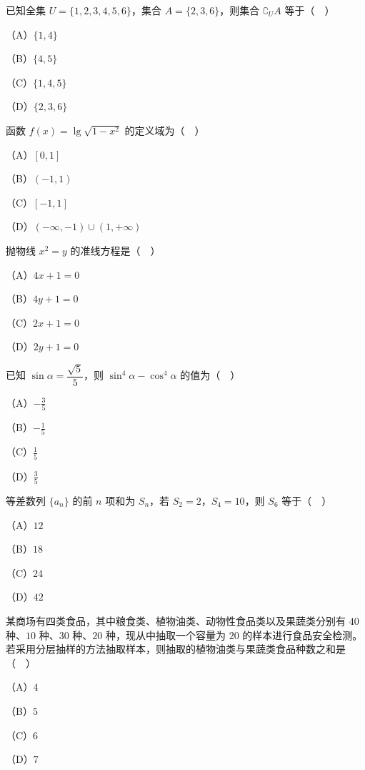 


\begin{question}
已知全集 $U=\{1,2,3,4,5,6\}$，集合 $A=\{2,3,6\}$，则集合 $\complement_UA$ 等于（　）

（A）$\{1,4\}$

（B）$\{4,5\}$

（C）$\{1,4,5\}$

（D）$\{2,3,6\}$

\end{question}
\begin{question}
函数 $f(x)=\lg\sqrt{1-x^2}$ 的定义域为（　）

（A）$[0,1]$

（B）$(-1,1)$

（C）$[-1,1]$

（D）$(-\infty,-1)\cup(1,+\infty)$

\end{question}
\begin{question}
抛物线 $x^2=y$ 的准线方程是（　）

（A）$4x+1=0$

（B）$4y+1=0$

（C）$2x+1=0$

（D）$2y+1=0$

\end{question}
\begin{question}
已知 $\sin\alpha=\dfrac{\sqrt5}{5}$，则 $\sin^4\alpha-\cos^4\alpha$ 的值为（　）

（A）$-\frac35$

（B）$-\frac15$

（C）$\frac15$

（D）$\frac35$

\end{question}
\begin{question}
等差数列 $\{a_n\}$ 的前 $n$ 项和为 $S_n$，若 $S_2=2$，$S_4=10$，则 $S_6$ 等于（　）

（A）$12$

（B）$18$

（C）$24$

（D）$42$

\end{question}
\begin{question}
某商场有四类食品，其中粮食类、植物油类、动物性食品类以及果蔬类分别有 $40$ 种、$10$ 种、$30$ 种、$20$ 种，现从中抽取一个容量为 $20$ 的样本进行食品安全检测。若采用分层抽样的方法抽取样本，则抽取的植物油类与果蔬类食品种数之和是（　）

（A）$4$

（B）$5$

（C）$6$

（D）$7$

\end{question}
